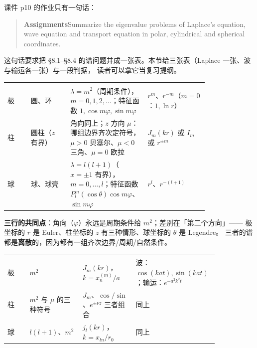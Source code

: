 \label{sec:s8}

课件 p10 的作业只有一句话：

\begin{quote}
\textbf{Assignments}\quad Summarize the eigenvalue problems of Laplace's equation, wave equation
and transport equation in polar, cylindrical and spherical coordinates.
\end{quote}

这句话要求把 §8.1--§8.4 的谱问题并成一张表。本节给三张表（Laplace 一张、波与输运各一张）与一段判据，
读者可以拿它当复习提纲。


\begin{center}
\tabtop
\begin{tabular}{@{}L{0.10\linewidth}L{0.17\linewidth}L{0.27\linewidth}L{0.26\linewidth}@{}}
 &  &  &  \\
\tabmidrule
极 & 圆、环 & $\lambda=m^2$（周期条件），$m=0,1,2,\dots$；特征函数 $1,\cos m\varphi,\sin m\varphi$ & $r^m$、$r^{-m}$（$m=0$：$1,\ln r$） \\
柱 & 圆柱（$z$ 有界） & 角向同上；$z$ 方向 $\mu$：哪组边界齐次定符号，$\mu>0$ 贝塞尔、$\mu<0$ 三角、$\mu=0$ 欧拉 & $J_m(kr)$ 或 $I_m$ 或 $r^{\pm m}$ \\
球 & 球、球壳 & $\lambda=l(l+1)$（$x=\pm1$ 有界），$m=0,\dots,l$；特征函数 $P_l^m(\cos\theta)\cos m\varphi$、$\sin m\varphi$ & $r^l$、$r^{-(l+1)}$ \\
\end{tabular}
\tabbot
\end{center}

\textbf{三行的共同点}：角向（$\varphi$）永远是周期条件给 $m^2$；差别在「第二个方向」——
极坐标的 $r$ 是 Euler、柱坐标的 $z$ 有三种情形、球坐标的 $\theta$ 是 Legendre。
三者的谱都是\textbf{离散}的，因为都有一组齐次边界/周期/自然条件。


\begin{center}
\tabtop
\begin{tabular}{@{}L{0.10\linewidth}L{0.24\linewidth}L{0.24\linewidth}L{0.26\linewidth}@{}}
 &  &  &  \\
\tabmidrule
极 & $m^2$ & $J_m(kr)$，$k=x_n^{(m)}/a$ & 波：$\cos(kat),\sin(kat)$；输运：$e^{-a^2k^2t}$ \\
柱 & $m^2$ 与 $\mu$ 的三种符号 & $J_m$、$\cos/\sin$、$e^{\pm\nu z}$ 三者组合 & 同上 \\
球 & $l(l+1)$、$m^2$ & $j_l(kr)$，$k=x_{ln}/r_0$ & 同上 \\
\end{tabular}
\tabbot
\end{center}

